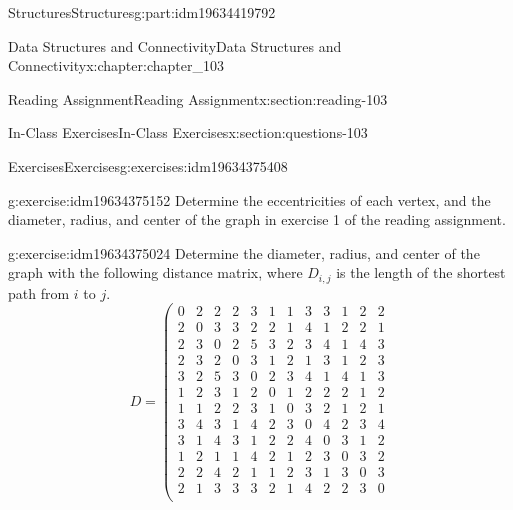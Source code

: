 \documentclass[oneside,10pt,]{book}
\numberwithin{equation}{section}
\begin{document}
\begin{partptx}{Structures}{}{Structures}{}{}{g:part:idm19634419792}
\begin{chapterptx}{Data Structures and Connectivity}{}{Data Structures and Connectivity}{}{}{x:chapter:chapter_103}
\begin{sectionptx}{Reading Assignment}{}{Reading Assignment}{}{}{x:section:reading-103}
\end{sectionptx}
%
%
\typeout{************************************************}
\typeout{************************************************}
%
\begin{sectionptx}{In-Class Exercises}{}{In-Class Exercises}{}{}{x:section:questions-103}
%
%
%
\typeout{************************************************}
\typeout{************************************************}
%
\begin{exercises-subsection-numberless}{Exercises}{}{Exercises}{}{}{g:exercises:idm19634375408}
\par\medskip\noindent%
%
\begin{exercisegroup}
\begin{divisionexerciseeg}{1}{}{}{g:exercise:idm19634375152}%
Determine the eccentricities of each vertex, and the diameter, radius, and center of the graph in exercise 1 of the reading assignment.%
\end{divisionexerciseeg}%
\begin{divisionexerciseeg}{2}{}{}{g:exercise:idm19634375024}%
Determine the diameter, radius, and center of the graph with the following distance matrix, where \(D_{i,j}\) is the length of the shortest path from \(i\) to \(j\).%
\begin{equation*}
D=\left(
\begin{array}{cccccccccccc}
0 & 2 & 2 & 2 & 3 & 1 & 1 & 3 & 3 & 1 & 2 & 2 \\
2 & 0 & 3 & 3 & 2 & 2 & 1 & 4 & 1 & 2 & 2 & 1 \\
2 & 3 & 0 & 2 & 5 & 3 & 2 & 3 & 4 & 1 & 4 & 3 \\
2 & 3 & 2 & 0 & 3 & 1 & 2 & 1 & 3 & 1 & 2 & 3 \\
3 & 2 & 5 & 3 & 0 & 2 & 3 & 4 & 1 & 4 & 1 & 3 \\
1 & 2 & 3 & 1 & 2 & 0 & 1 & 2 & 2 & 2 & 1 & 2 \\
1 & 1 & 2 & 2 & 3 & 1 & 0 & 3 & 2 & 1 & 2 & 1 \\
3 & 4 & 3 & 1 & 4 & 2 & 3 & 0 & 4 & 2 & 3 & 4 \\
3 & 1 & 4 & 3 & 1 & 2 & 2 & 4 & 0 & 3 & 1 & 2 \\
1 & 2 & 1 & 1 & 4 & 2 & 1 & 2 & 3 & 0 & 3 & 2 \\
2 & 2 & 4 & 2 & 1 & 1 & 2 & 3 & 1 & 3 & 0 & 3 \\
2 & 1 & 3 & 3 & 3 & 2 & 1 & 4 & 2 & 2 & 3 & 0 \\
\end{array}

\end{equation*}
\end{divisionexerciseeg}
\end{exercisegroup}
\end{exercises-subsection-numberless}
\end{sectionptx}
\end{chapterptx}
\end{partptx}
\end{document}
